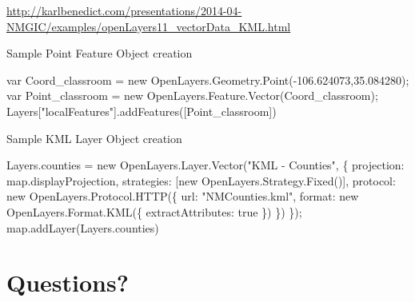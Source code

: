 \documentclass[]{article}
\newenvironment{Shaded}{}{}
\newcommand{\NormalTok}[1]{{#1}}
\begin{document}
\url{http://karlbenedict.com/presentations/2014-04-NMGIC/examples/openLayers11_vectorData_KML.html}

Sample Point Feature Object creation

\begin{Shaded}
\begin{Highlighting}[numbers=left,,]
    \NormalTok{var Coord_classroom = new OpenLayers.Geometry.Point(-106.624073,35.084280);}
    \NormalTok{var Point_classroom = new OpenLayers.Feature.Vector(Coord_classroom);}
    \NormalTok{Layers["localFeatures"].addFeatures([Point_classroom])}
\end{Highlighting}
\end{Shaded}

Sample KML Layer Object creation

\begin{Shaded}
\begin{Highlighting}[numbers=left,,]
    \NormalTok{Layers.counties = new OpenLayers.Layer.Vector("KML - Counties", \{}
        \NormalTok{projection: map.displayProjection,}
        \NormalTok{strategies: [new OpenLayers.Strategy.Fixed()],}
        \NormalTok{protocol: new OpenLayers.Protocol.HTTP(\{}
            \NormalTok{url: "NMCounties.kml",}
            \NormalTok{format: new OpenLayers.Format.KML(\{}
                \NormalTok{extractAttributes: true}
            \NormalTok{\})}
        \NormalTok{\})}
    \NormalTok{\});}
    \NormalTok{map.addLayer(Layers.counties)}
\end{Highlighting}
\end{Shaded}

\section{Questions?}\label{questions}
\end{document}
